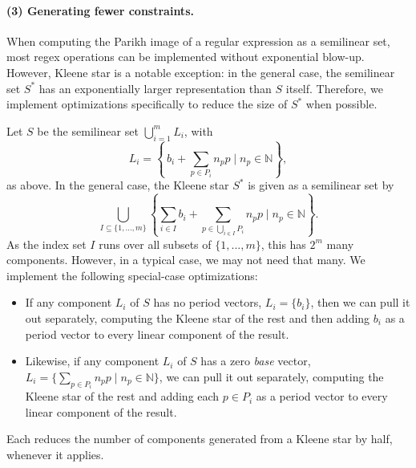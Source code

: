 
\paragraph{(3) Generating fewer constraints.}
When computing the Parikh image of a regular expression as a semilinear set,
most regex operations can be implemented without exponential blow-up.
However, Kleene star is a notable exception: in the general case, the
semilinear set $S^\ast$ has an exponentially larger representation than $S$
itself.  Therefore, we implement optimizations specifically to reduce the size
of $S^\ast$ when possible.

Let $S$ be the semilinear set $\bigcup_{i=1}^m L_i$, with
\[
  L_i=\left\{\,b_i+\sum_{p\in P_i}n_p p \mid n_p\in\mathbb N \right\},
\]
as above. In the general case, the Kleene star $S^\ast$ is given as a semilinear set by
\[
  \bigcup_{I \subseteq \{1,...,m\}} \left\{
    \sum_{i \in I} b_i
    + \sum_{p \in \bigcup_{i \in I} P_i} n_p p \mid n_p \in \mathbb N \right\}.
\]
As the index set $I$ runs over all subsets of $\{1,...,m\}$, this has $2^m$ many components. However, in a typical case, we may not need that many. We implement the following special-case optimizations:
\begin{itemize}
  \item If any component $L_i$ of $S$ has no period vectors, $L_i = \{b_i\}$, then we can pull it out separately, computing the Kleene star of the rest and then adding $b_i$ as a period vector to every linear component of the result.

  \item Likewise, if any component $L_i$ of $S$ has a zero \emph{base} vector,
    $L_i = \{ \sum_{p \in P_i} n_p p \mid n_p \in \mathbb N\}$,
    we can pull it out separately, computing the Kleene star of the rest and adding each $p \in P_i$ as a period vector to every linear component of the result.
\end{itemize}
Each reduces the number of components generated from a Kleene star by
half, whenever it applies.

